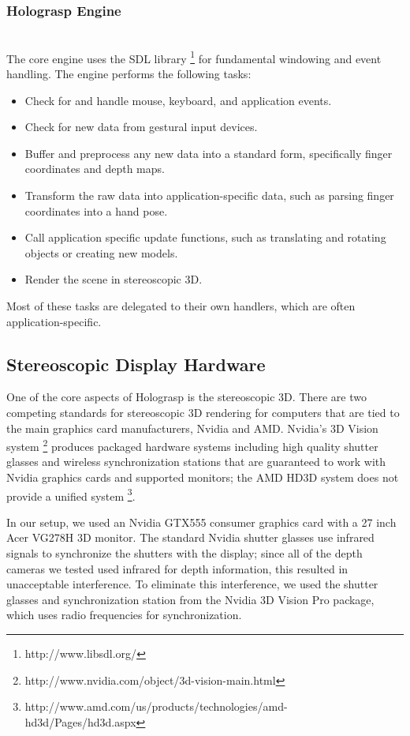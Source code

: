 \documentclass[pageno]{jpaper}
\begin{document}
\subsubsection{Holograsp Engine}$ $\\
The core engine uses the SDL library \footnote{http://www.libsdl.org/} for fundamental windowing and event handling. 
The engine performs the following tasks:
\begin{itemize}
\item Check for and handle mouse, keyboard, and application events.
\item Check for new data from gestural input devices.
\item Buffer and preprocess any new data into a standard form, specifically finger coordinates and depth maps.
\item Transform the raw data into application-specific data, such as parsing finger coordinates into a hand pose.
\item Call application specific update functions, such as translating and rotating objects or creating new models.
\item Render the scene in stereoscopic 3D.
\end{itemize}

Most of these tasks are delegated to their own handlers, which are often application-specific.

\subsection{Stereoscopic Display Hardware}
One of the core aspects of Holograsp is the stereoscopic 3D. There are two competing standards for stereoscopic 3D rendering for computers
that are tied to the main graphics card manufacturers, Nvidia and AMD. Nvidia's 3D Vision system \footnote{http://www.nvidia.com/object/3d-vision-main.html}
produces packaged hardware systems including high quality shutter glasses and wireless synchronization stations that are guaranteed to work with Nvidia
graphics cards and supported monitors; the AMD HD3D system does not provide a unified system \footnote{http://www.amd.com/us/products/technologies/amd-hd3d/Pages/hd3d.aspx}.

In our setup, we used an Nvidia GTX555 consumer graphics card with a 27 inch Acer VG278H 3D monitor. The standard Nvidia shutter glasses use infrared
signals to synchronize the shutters with the display; since all of the depth cameras we tested used infrared for depth information, this resulted in
unacceptable interference. To eliminate this interference, we used the shutter glasses and synchronization station from the Nvidia 3D Vision Pro
package, which uses radio frequencies for synchronization.
\end{document}

